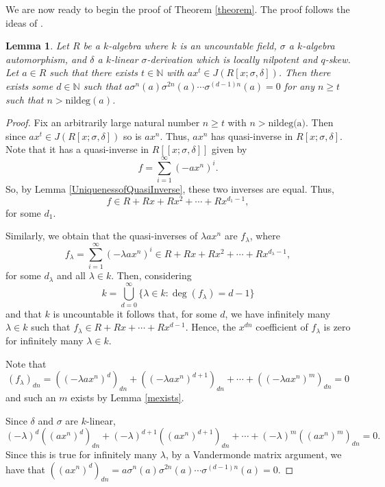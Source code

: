 \documentclass[12pt]{amsart}
\newtheorem{lem}[thm]{Lemma}
\theoremstyle{definition}
\theoremstyle{definition}
\theoremstyle{definition}
\theoremstyle{remark}
\theoremstyle{definition}
\begin{document}
We are now ready to begin the proof of Theorem \ref{theorem}. The proof follows the ideas of \cite[Proposition 2.1]{SMOKTUNOWICZuncountablefield}.

\begin{lem}
\label{lemma}
    Let $R$ be a $k$-algebra where $k$ is an uncountable field, $\sigma$ a $k$-algebra automorphism, and $\delta$ a $k$-linear
    $\sigma$-derivation which is locally nilpotent and $q$-skew. Let $a \in R$ such that there exists $t \in \mathbb{N}$ with $ax^{t} \in J(R[x;\sigma,\delta])$. Then there exists some $d \in \mathbb{N}$ such that $a\sigma^n(a)\sigma^{2n}(a)\cdots\sigma^{(d-1)n}(a) = 0$ for any $n \geq t$ such that $n > \text{nildeg}(a)$.
\end{lem}

\begin{proof}
     Fix an arbitrarily large natural number $n \geq t$ with $n > \text{nildeg(a)}$. Then since $ax^{t} \in J(R[x;\sigma,\delta])$ so is $ax^n$. Thus, $ax^n$ has quasi-inverse in $R[x;\sigma,\delta]$. Note that it has a quasi-inverse in $R[[x;\sigma,\delta]]$ given by  \[
        f = \sum_{i=1}^\infty (-ax^n)^i.
    \] So, by Lemma \ref{UniquenessofQuasiInverse}, these two inverses are equal. Thus, $$f \in R+Rx+Rx^2+\cdots+Rx^{d_1-1},$$ for some $d_1$. 
    
    Similarly, we obtain that the quasi-inverses of $\lambda a x^n$ are $f_\lambda$, where $$f_\lambda = \sum_{i=1}^\infty (-\lambda ax^n)^i \in R+Rx+Rx^2+\cdots+Rx^{d_\lambda-1},$$ for some $d_\lambda$ and all $\lambda \in k$. Then, considering \[
        k = \bigcup_{d=0}^\infty \{\lambda \in k:\deg(f_\lambda) = d-1\}
    \] and that $k$ is uncountable it follows that, for some $d$, we have infinitely many $\lambda \in k$ such that $f_\lambda \in R+Rx+\cdots+Rx^{d-1}$. Hence, the $x^{dn}$ coefficient of $f_\lambda$ is zero for infinitely many $\lambda \in k$.
    
    Note that \[
        (f_\lambda)_{dn} = ((-\lambda ax^n)^d)_{dn}+((-\lambda ax^n)^{d+1})_{dn}+\cdots +((-\lambda ax^n)^m)_{dn} = 0
    \] and such an $m$ exists by Lemma \ref{mexists}. 

    Since $\delta$ and $\sigma$ are $k$-linear, \[
        (-\lambda)^d(( ax^n)^d)_{dn}+(-\lambda)^{d+1}(( ax^n)^{d+1})_{dn}+\cdots +(-\lambda)^{m}(( ax^n)^m)_{dn}  = 0.
    \] Since this is true for infinitely many $\lambda$, by a Vandermonde matrix argument, we have that $(( ax^n)^d)_{dn} = a\sigma^n(a)\sigma^{2n}(a)\cdots\sigma^{(d-1)n}(a) = 0.$
\end{proof}
\end{document}
